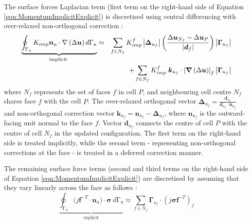 \documentclass[sn-mathphys,Numbered]{sn-jnl}%
\newcommand{\bb}{\boldsymbol}
\begin{document}
 The surface forces Laplacian term (first term on the right-hand side of Equation \ref{eqn:MomentumImplicitExplicit}) is discretised using central differencing with over-relaxed non-orthogonal correction \cite{demirdzic_finite_1993, jasak_application_2000, cardiff_development_2014, cardiff_large_2014, cardiff_lagrangian_2017}:
\begin{eqnarray} \label{eq:diffusion}
	\underbrace{\oint_{\mathrm{\Gamma}_u}
	K_{imp} \bb{n}_u\cdot\nabla\left(\Delta\bb{u}\right) d\mathrm{\Gamma}_u }_{\text {implicit }}
	&\approx&
	\sum_{f \in N_f} K_{imp}^f \left|\boldsymbol{\Delta}_{u_f}\right|\left(\frac{\Delta \bb{u}_{N_f} - \Delta \bb{u}_P}{\left|\bb{d}_f\right|}\right)\left|\bb{\Gamma}_{u_f}\right| \notag \\
	    &&+ \sum_{f \in N_f} K_{imp}^f \; \bb{k}_{u_f} \cdot
	    \left[
	    \boldsymbol{\nabla} \left(\mathrm{\Delta}\bb{u}\right)
	    \right]_f
	    \left|\bb{\Gamma}_{u_f}\right|
\end{eqnarray}
where $N_f$ represents the set of faces $f$ in cell $P$, and neighbouring cell centre $N_f$ shares face $f$ with the cell $P$.
The over-relaxed orthogonal vector $\boldsymbol{\Delta}_{u_f} = \frac{\boldsymbol{d}_{u_f}}{\boldsymbol{d}_{u_f} \cdot \boldsymbol{n}_{u_f}}$ and non-orthogonal correction vector $\boldsymbol{k}_{u_f}=\boldsymbol{n}_{u_f}-\boldsymbol{\Delta}_{u_f}$, where $\boldsymbol{n}_{u_f}$ is the outward-facing unit normal to the face $f$.
Vector $\boldsymbol{d}_{u_f}$ connects the centre of cell $P$ with the centre of cell $N_f$ in the updated configuration.
The first term on the right-hand side is treated implicitly, while the second term - representing non-orthogonal corrections at the face - is treated in a deferred correction manner.

 The remaining surface force terms (second and third terms on the right-hand side of Equation \ref{eqn:MomentumImplicitExplicit}) are discretised by assuming that they vary linearly across the face as follows \cite{noauthor_openfoam_2015}:
\begin{equation}
	\underbrace{ \oint_{\mathrm{\Gamma_u}}(j\bb{f}^{-T}\cdot{\bb{n}_u)\cdot\boldsymbol{\sigma}}\ d\mathrm{\Gamma_u}  }_{\text {explicit}}
	\approx 
	\sum_{f \in N_f} \bb{\Gamma}_{u_f} \cdot
	\left(j\boldsymbol{\sigma} \bb{f}^{-T}\right)_f
\end{equation}
	
\end{document}
